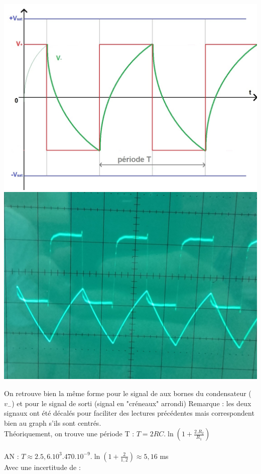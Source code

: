 \documentclass[11pt,a4paper]{article}
\begin{document}
\includegraphics[scale=0.3]{oscastable}
\hspace{1.5cm}
\includegraphics[scale=0.1]{osc1}

On retrouve bien la même forme pour le signal de aux bornes du condensateur ($v_-$) et pour le signal de sorti (signal en "créneaux" arrondi) 
Remarque : les deux signaux ont été décalés pour faciliter des lectures précédentes mais correspondent bien au graph s'ils sont centrés.\\

Théoriquement, on trouve une période T :
\hspace{1.5cm} $T = 2RC.\ln(1+\frac{2.R_2}{R_1})$\\ \\
AN : $T \approx 2.5,6.10^3 . 470.10^{-9}. \ln(1 + \frac{2}{1,2}) \approx 5,16$ ms\\
Avec une incertitude de :
\end{document}
